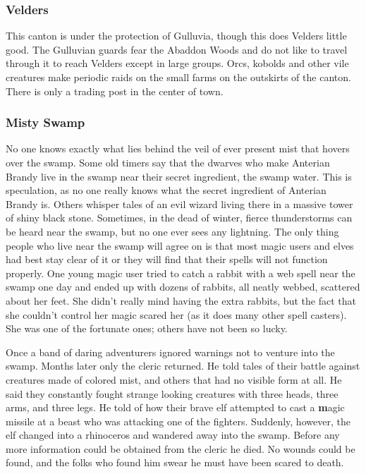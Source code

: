 \documentclass[palace_of_the_silver_princess]{subfiles}
\begin{document}
\subsubsection{Velders}

This canton is under the protection of Gulluvia, though this does
Velders little good. The Gulluvian guards fear the Abaddon Woods and do
not like to travel through it to reach Velders except in large groups.
Orcs, kobolds and other vile creatures make periodic raids on the small
farms on the outskirts of the canton.  There is only a trading post in
the center of town.

\subsubsection{Misty Swamp}

No one knows exactly what lies behind the veil of
ever present mist that hovers over the swamp. Some old timers say
that the dwarves who make Anterian Brandy live in the swamp near
their secret ingredient, the swamp water. This is speculation, as no
one really knows what the secret ingredient of Anterian Brandy is.
Others whisper tales of an evil wizard living there in a massive
tower of shiny black stone. Sometimes, in the dead of winter, fierce
thunderstorms can be heard near the swamp, but no one ever sees
any lightning. The only thing people who live near the swamp will
agree on is that most magic users and elves had best stay clear of it
or they will find that their spells will not function properly. One
young magic user tried to catch a rabbit with a web spell near the
swamp one day and ended up with dozens of rabbits, all neatly
webbed, scattered about her feet. She didn’t really mind having the
extra rabbits, but the fact that she couldn’t control her magic
scared her (as it does many other spell casters). She was one of the
fortunate ones; others have not been so lucky.

Once a band of daring adventurers ignored warnings not to venture into
the swamp. Months later only the cleric returned. He told tales of their
battle against creatures made of colored mist, and others that had no
visible form at all. He said they constantly fought strange looking
creatures with three heads, three arms, and three legs. He told of how
their brave elf attempted to cast a {\textbf magic missile} at a beast
who was attacking one of the fighters. Suddenly, however, the elf
changed into a rhinoceros and wandered away into the swamp. Before any
more information could be obtained from the cleric he died. No wounds
could be found, and the folks who found him swear he must have been
scared to death.
\end{document}
